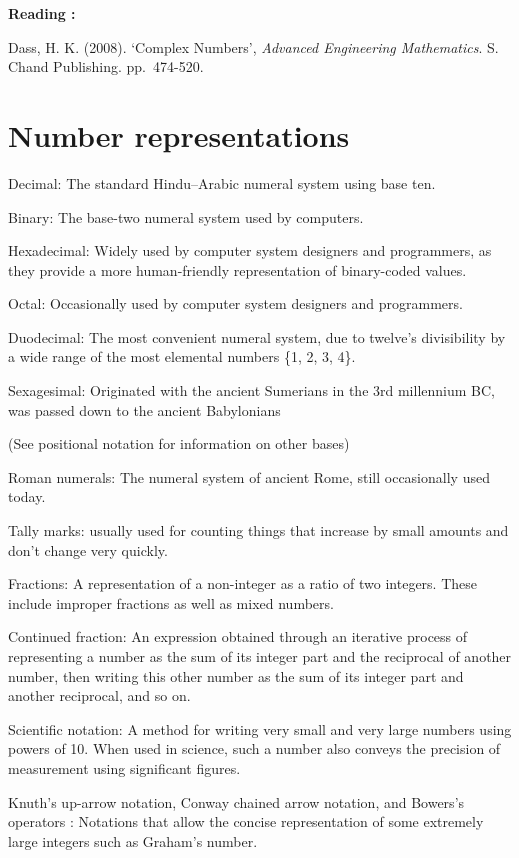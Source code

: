 \documentclass[]{book}
\begin{document}
\textbf{Reading :}

Dass, H. K. (2008). `Complex Numbers', \emph{Advanced Engineering Mathematics}. S. Chand Publishing. pp.~474-520.

\hypertarget{number-representations}{%
\section{Number representations}\label{number-representations}}

Decimal: The standard Hindu--Arabic numeral system using base ten.

Binary: The base-two numeral system used by computers.

Hexadecimal: Widely used by computer system designers and programmers, as they provide a more human-friendly representation of binary-coded values.

Octal: Occasionally used by computer system designers and programmers.

Duodecimal: The most convenient numeral system, due to twelve's divisibility by a wide range of the most elemental numbers \{1, 2, 3, 4\}.

Sexagesimal: Originated with the ancient Sumerians in the 3rd millennium BC, was passed down to the ancient Babylonians

(See positional notation for information on other bases)

Roman numerals: The numeral system of ancient Rome, still occasionally used today.

Tally marks: usually used for counting things that increase by small amounts and don't change very quickly.

Fractions: A representation of a non-integer as a ratio of two integers. These include improper fractions as well as mixed numbers.

Continued fraction: An expression obtained through an iterative process of representing a number as the sum of its integer part and the reciprocal of another number, then writing this other number as the sum of its integer part and another reciprocal, and so on.

Scientific notation: A method for writing very small and very large numbers using powers of 10. When used in science, such a number also conveys the precision of measurement using significant figures.

Knuth's up-arrow notation, Conway chained arrow notation, and Bowers's operators : Notations that allow the concise representation of some extremely large integers such as Graham's number.
\end{document}
